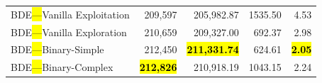 \documentclass[mathematics,article,accept,moreauthors]{Definitions/mdpi}
\begin{document}
\begin{table}[H]
\begin{tabularx}{\textwidth}{lRRRR}
    \midrule
    BDE\hl{---}Vanilla Exploitation  &         209,597 &        205,982.87 & 1535.50 &         4.53 \\
    BDE\hl{---}Vanilla Exploration   &         210,659 &        209,327.00 & 692.37 &         2.98 \\
    BDE\hl{---}Binary-Simple         &         212,450 & \textbf{\hl{211,331.74}} & 624.61 & \textbf{\hl{2.05}} \\
    BDE\hl{---}Binary-Complex        & \textbf{\hl{212,826}} &        210,918.19 & 1043.15 &         2.24 \\
    \bottomrule
  \end{tabularx}
\end{table}

\vspace{-9pt}

\end{document}
